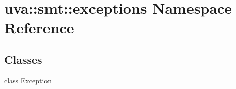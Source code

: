 \hypertarget{namespaceuva_1_1smt_1_1exceptions}{}\section{uva\+:\+:smt\+:\+:exceptions Namespace Reference}
\label{namespaceuva_1_1smt_1_1exceptions}
\subsection*{Classes}
\begin{DoxyCompactItemize}
\item 
class \hyperlink{classuva_1_1smt_1_1exceptions_1_1_exception}{Exception}
\end{DoxyCompactItemize}
